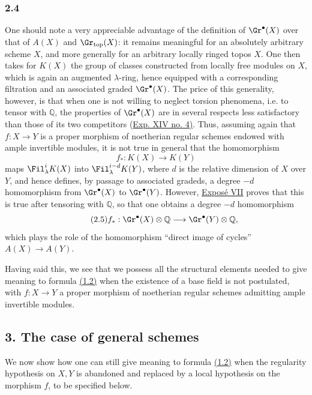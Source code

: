 \subsubsection*{2.4}
One should note a very appreciable advantage of the definition of $\Gr^\bullet(X)$ over that of $A(X)$ and $\Gr_{\mathrm{top}}(X)$: it remains meaningful for an absolutely arbitrary scheme $X$, and more generally for an arbitrary locally ringed topos $X$. One then takes for $K(X)$ the group of classes constructed from locally free modules on $X$, which is again an augmented $\lambda$-ring, hence equipped with a corresponding filtration and an associated graded $\Gr^\bullet(X)$. The price of this generality, however, is that when one is not willing to neglect torsion phenomena, i.e. to tensor with $\mathbb Q$, the properties of $\Gr^\bullet(X)$ are in several respects less satisfactory than those of its two competitors (\hyperlink{sga6.e14.sec.4}{Exp. XIV no. 4)}. Thus, assuming again that $f:X\to Y$ is a proper morphism of noetherian regular schemes endowed with ample invertible modules, it is not true in general that the homomorphism
\[
f_*:K(X)\longrightarrow K(Y)
\]
maps $\Fil^i_\lambda K(X)$ into $\Fil^{i-d}_\lambda K(Y)$, where $d$ is the relative dimension of $X$ over $Y$, and hence defines, by passage to associated gradeds, a degree $-d$ homomorphism from $\Gr^\bullet(X)$ to $\Gr^\bullet(Y)$. However, \hyperlink{sga6.e07.expose}{Exposé VII} proves that this is true after tensoring with $\mathbb Q$, so that one obtains a degree $-d$ homomorphism
\begin{equation}\tag{2.5}
f_*:\Gr^\bullet(X)\otimes\mathbb Q\longrightarrow \Gr^\bullet(Y)\otimes\mathbb Q,
\end{equation}
which plays the role of the homomorphism ``direct image of cycles'' $A(X)\to A(Y)$.

Having said this, we see that we possess all the structural elements needed to give meaning to formula \hyperlink{sga6.e00.eq.1-2}{(1.2)} when the existence of a base field is not postulated, with $f:X\to Y$ a proper morphism of noetherian regular schemes admitting ample invertible modules.

\subsection*{3. The case of general schemes}
We now show how one can still give meaning to formula \hyperlink{sga6.e00.eq.1-2}{(1.2)} when the regularity hypothesis on $X,Y$ is abandoned and replaced by a local hypothesis on the morphism $f$, to be specified below.

